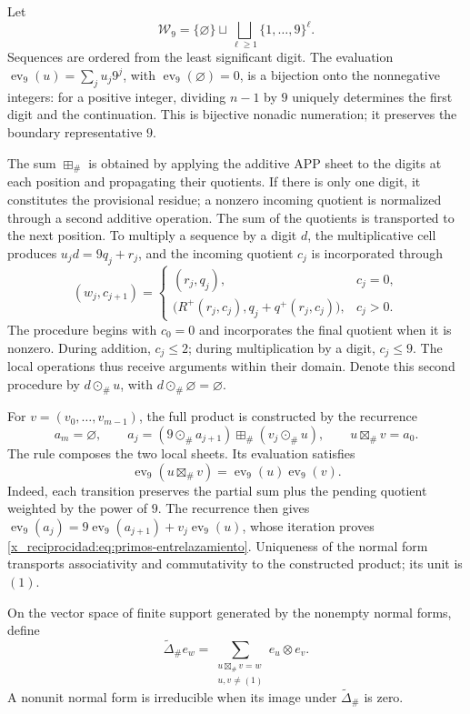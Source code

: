 Let
\[
 \mathcal W_9=\{\varnothing\}\sqcup
 \bigsqcup_{\ell\geq1}\{1,\ldots,9\}^{\ell}.
\]
Sequences are ordered from the least significant digit. The evaluation
\(\operatorname{ev}_9(u)=\sum_j u_j9^j\), with
\(\operatorname{ev}_9(\varnothing)=0\), is a bijection onto the nonnegative
integers: for a positive integer, dividing \(n-1\) by \(9\)
uniquely determines the first digit and the continuation. This is
bijective nonadic numeration; it preserves the boundary representative
\(9\).

The sum \(\boxplus_\#\) is obtained by applying the additive APP sheet to the
digits at each position and propagating their quotients. If there is only one digit,
it constitutes the provisional residue; a nonzero incoming quotient is
normalized through a second additive operation. The sum of the
quotients is transported to the next position. To multiply a
sequence by a digit \(d\), the multiplicative cell produces
\(u_jd=9q_j+r_j\), and the incoming quotient \(c_j\) is incorporated through
\[
 (w_j,c_{j+1})=
 \begin{cases}
 (r_j,q_j),&c_j=0,\\
 \bigl(R^+(r_j,c_j),q_j+q^+(r_j,c_j)\bigr),&c_j>0.
 \end{cases}
\]
The procedure begins with \(c_0=0\) and incorporates the final quotient when it is
nonzero. During addition, \(c_j\leq2\); during multiplication by a digit,
\(c_j\leq9\). The local operations thus receive arguments within
their domain. Denote this second procedure by \(d\odot_\#u\),
with \(d\odot_\#\varnothing=\varnothing\).

For \(v=(v_0,\ldots,v_{m-1})\), the full product is constructed by
the recurrence
\[
 a_m=\varnothing,\qquad
 a_j=(9\odot_\#a_{j+1})\boxplus_\#(v_j\odot_\#u),
 \qquad u\boxtimes_\#v=a_0.
\]
The rule composes the two local sheets. Its evaluation satisfies
\begin{equation}
 \operatorname{ev}_9(u\boxtimes_\#v)
   =\operatorname{ev}_9(u)\operatorname{ev}_9(v).
 \label{x_reciprocidad:eq:primos-entrelazamiento}
\end{equation}
Indeed, each transition preserves the partial sum plus the pending
quotient weighted by the power of \(9\). The recurrence then gives
\(\operatorname{ev}_9(a_j)=9\operatorname{ev}_9(a_{j+1})+
v_j\operatorname{ev}_9(u)\), whose iteration proves
\eqref{x_reciprocidad:eq:primos-entrelazamiento}. Uniqueness of the normal form transports
associativity and commutativity to the constructed product; its unit is \((1)\).

\begin{definition}
On the vector space of finite support generated by the nonempty
normal forms, define
\[
 \widetilde\Delta_\# e_w
 =\sum_{\substack{u\boxtimes_\#v=w\\u,v\ne(1)}}e_u\otimes e_v.
\]
A nonunit normal form is irreducible when its image under
\(\widetilde\Delta_\#\) is zero.
\end{definition}

